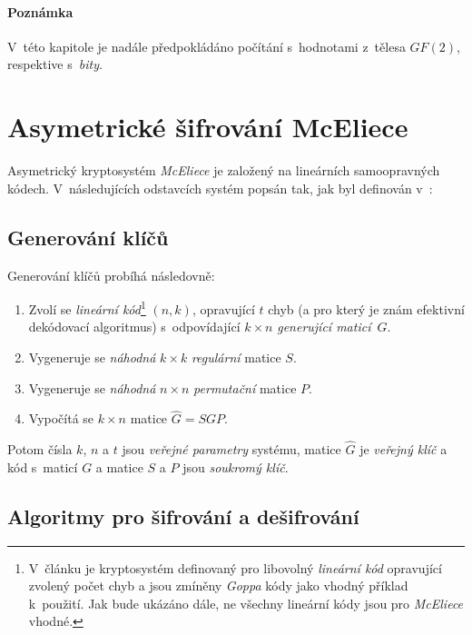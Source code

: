 \documentclass[thesis=M,czech,hidelinks]{FITthesis}[2012/06/26]
\newcommand{\0}{{\textcolor[gray]{0.80}{0}}}
\begin{document}
\paragraph{Poznámka} V~této kapitole je nadále předpokládáno počítání
s~hodnotami z~tělesa $GF(2)$, respektive s~\emph{bity}.

\section{Asymetrické šifrování McEliece}
Asymetrický kryptosystém \emph{McEliece} je založený na lineárních samoopravných
kódech. V~následujících odstavcích systém popsán tak, jak byl
definován v~\cite{McEliece}:

\subsection{Generování klíčů}
Generování klíčů probíhá následovně:

\begin{enumerate}
    \item Zvolí se \emph{lineární kód}\footnote{
            V~článku je kryptosystém definovaný pro libovolný \emph{lineární
            kód} opravující zvolený počet chyb a jsou zmíněny \emph{Goppa} kódy
            jako vhodný příklad k~použití. Jak bude ukázáno dále, ne všechny
            lineární kódy jsou pro \emph{McEliece} vhodné.
        } $(n,k)$, opravující $t$ chyb (a pro který je znám efektivní dekódovací
        algoritmus) s~odpovídající $k \times n$ \emph{generující maticí}~$G$.
    \item Vygeneruje se \emph{náhodná} $k \times k$ \emph{regulární} matice $S$.
    \item Vygeneruje se \emph{náhodná} $n \times n$ \emph{permutační} matice $P$.
    \item Vypočítá se $k \times n$ matice $\hat{G} = S G P$.
\end{enumerate}

Potom čísla $k$, $n$ a $t$ jsou \emph{veřejné parametry} systému, matice
$\hat{G}$ je \emph{veřejný klíč} a kód s~maticí $G$ a matice $S$ a $P$ jsou
\emph{soukromý klíč}.

\subsection{Algoritmy pro šifrování a dešifrování}
\end{document}
